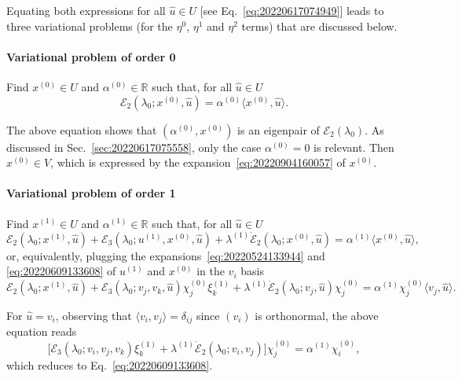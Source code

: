 \documentclass[12pt, final]{scrartcl}
\theoremstyle{definition}
\newcommand{\E}{\mathcal E}
\newcommand{\order}[2][1]{#2^{(#1)}}
\newcommand{\reals}{\mathbb{R}}
\begin{document}
Equating both expressions for all $\hat{u} \in U$ [see
Eq.~\eqref{eq:20220617074949}] leads to three variational problems (for the
$η^0$, $η^1$ and $η^2$ terms) that are discussed below.

\paragraph{Variational problem of order 0} Find $\order[0]x \in U$ and $\order[0]α\in\reals$ such
that, for all $\hat{u} \in U$
\begin{equation*}
  \E_2(\lambda_0; \order[0]x, \hat{u}) = \order[0]α 〈 \order[0]x, \hat{u} 〉.
\end{equation*}

The above equation shows that $(\order[0]α, \order[0]x)$ is an eigenpair of $\E_2(\lambda_0)$. As
discussed in Sec.~\ref{sec:20220617075558}, only the case $\order[0]α = 0$ is
relevant. Then $\order[0]x \in V$, which is expressed by the
expansion~\eqref{eq:20220904160057} of $\order[0]x$.

\paragraph{Variational problem of order 1} Find $\order[1]x \in U$ and $\order[1]α\in\reals$ such
that, for all $\hat{u} \in U$
\begin{equation}
  \label{eq:20220609131953}
  \E_2(\lambda_0; \order[1]x, \hat{u}) + \E_3(\lambda_0; \order[1]u, \order[0]x, \hat{u}) + \order[1]\lambda \dot{\E}_2(\lambda_0; \order[0]x, \hat{u})
  = \order[1]α 〈 \order[0]x, \hat{u} 〉,
\end{equation}
or, equivalently, plugging the expansions~\eqref{eq:20220524133944} and
\eqref{eq:20220609133608} of $\order[1]u$ and $\order[0]x$ in the $v_i$ basis
\begin{equation}
  \label{eq:20220617080547}
  \E_2(\lambda_0; \order[1]x, \hat{u}) + \E_3(\lambda_0; v_j, v_k, \hat{u}) \order[0]{χ_j} \order[1]{ξ_k} + \order[1]\lambda \dot{\E}_2(\lambda_0; v_j, \hat{u}) \order[0]{χ_j}
  = \order[1]α \order[0]{χ_j} 〈 v_j, \hat{u} 〉.
\end{equation}

For $\hat{u} = v_i$, observing that $〈 v_i, v_j 〉 = δ_{ij}$ since
$(v_i)$ is orthonormal, the above equation reads
\begin{equation}
  \bigl[\E_3(\lambda_0; v_i, v_j, v_k) \order[1]{ξ_k} + \order[1]\lambda \dot{\E}_2(\lambda_0; v_i, v_j)\bigr] \order[0]{χ_j} = \order[1]α \order[0]{χ_i},
\end{equation}
which reduces to Eq.~\eqref{eq:20220609133608}.
\end{document}

